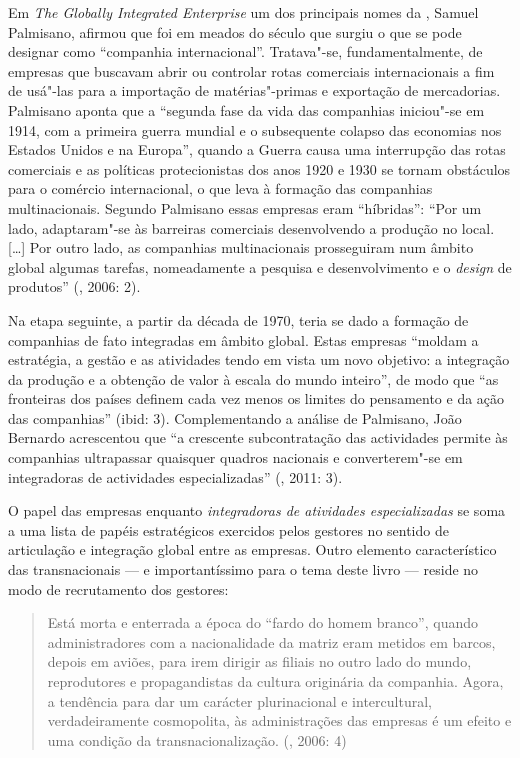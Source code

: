 Em \emph{The Globally Integrated Enterprise} um dos principais nomes da
, Samuel Palmisano, afirmou que foi em meados do século  que
surgiu o que se pode designar como ``companhia internacional''.
Tratava"-se, fundamentalmente, de empresas que buscavam abrir ou
controlar rotas comerciais internacionais a fim de usá"-las para a
importação de matérias"-primas e exportação de mercadorias. Palmisano
aponta que a ``segunda fase da vida das companhias iniciou"-se em 1914,
com a primeira guerra mundial e o subsequente colapso das economias nos
Estados Unidos e na Europa'', quando a Guerra causa uma interrupção das
rotas comerciais e as políticas protecionistas dos anos 1920 e 1930 se
tornam obstáculos para o comércio internacional, o que leva à formação
das companhias multinacionais. Segundo Palmisano essas empresas eram
``híbridas'': ``Por um lado, adaptaram"-se às barreiras comerciais
desenvolvendo a produção no local. {[}\ldots{}{]} Por outro lado, as
companhias multinacionais prosseguiram num âmbito global algumas
tarefas, nomeadamente a pesquisa e desenvolvimento e o \emph{design} de
produtos'' (, 2006: 2).

Na etapa seguinte, a partir da década de 1970, teria se dado a formação
de companhias de fato integradas em âmbito global. Estas empresas
``moldam a estratégia, a gestão e as atividades tendo em vista um novo
objetivo: a integração da produção e a obtenção de valor à escala do
mundo inteiro'', de modo que ``as fronteiras dos países definem cada vez
menos os limites do pensamento e da ação das companhias'' (ibid: 3).
Complementando a análise de Palmisano, João Bernardo acrescentou que ``a
crescente subcontratação das actividades permite às companhias
ultrapassar quaisquer quadros nacionais e converterem"-se em integradoras
de actividades especializadas'' (, 2011: 3).

O papel das empresas enquanto \emph{integradoras de atividades
especializadas} se soma a uma lista de papéis estratégicos exercidos
pelos gestores no sentido de articulação e integração global entre as
empresas. Outro elemento característico das transnacionais --- e
importantíssimo para o tema deste livro --- reside no modo de
recrutamento dos gestores:

\begin{quote}
Está morta e enterrada a época do ``fardo do homem branco'', quando
administradores com a nacionalidade da matriz eram metidos em barcos,
depois em aviões, para irem dirigir as filiais no outro lado do mundo,
reprodutores e propagandistas da cultura originária da companhia. Agora,
a tendência para dar um carácter plurinacional e intercultural,
verdadeiramente cosmopolita, às administrações das empresas é um efeito
e uma condição da transnacionalização. (, 2006: 4)
\end{quote}

